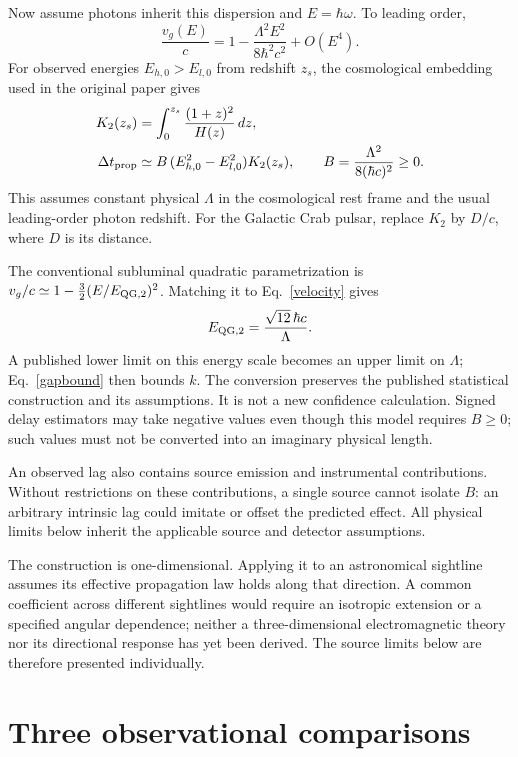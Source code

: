 \documentclass[11pt]{article}
\begin{document}
Now assume photons inherit this dispersion and $E=\hbar\omega$. To leading order,
\begin{equation}\label{velocity}
 \frac{v_g(E)}{c}=1-\frac{\Lambda^2E^2}{8\hbar^2c^2}+O(E^4).
\end{equation}
For observed energies $E_{h,0}>E_{l,0}$ from redshift $z_s$, the cosmological embedding used in the original paper gives
\begin{align}
 K_2(z_s)&=\int_0^{z_s}\frac{(1+z)^2}{H(z)}\,dz,\\
 \Delta t_{\rm prop}&\simeq B\,(E_{h,0}^2-E_{l,0}^2)K_2(z_s),
 \qquad B=\frac{\Lambda^2}{8(\hbar c)^2}\geq0.\label{delay}
\end{align}
This assumes constant physical $\Lambda$ in the cosmological rest frame and the usual leading-order photon redshift. For the Galactic Crab pulsar, replace $K_2$ by $D/c$, where $D$ is its distance.

The conventional subluminal quadratic parametrization is $v_g/c\simeq1-\tfrac32(E/E_{\rm QG,2})^2$. Matching it to Eq.~\eqref{velocity} gives
\begin{equation}\label{conversion}
 E_{\rm QG,2}=\frac{\sqrt{12}\,\hbar c}{\Lambda}.
\end{equation}
A published lower limit on this energy scale becomes an upper limit on $\Lambda$; Eq.~\eqref{gapbound} then bounds $k$. The conversion preserves the published statistical construction and its assumptions. It is not a new confidence calculation. Signed delay estimators may take negative values even though this model requires $B\geq0$; such values must not be converted into an imaginary physical length.

An observed lag also contains source emission and instrumental contributions. Without restrictions on these contributions, a single source cannot isolate $B$: an arbitrary intrinsic lag could imitate or offset the predicted effect. All physical limits below inherit the applicable source and detector assumptions.

The construction is one-dimensional. Applying it to an astronomical sightline assumes its effective propagation law holds along that direction. A common coefficient across different sightlines would require an isotropic extension or a specified angular dependence; neither a three-dimensional electromagnetic theory nor its directional response has yet been derived. The source limits below are therefore presented individually.

\section{Three observational comparisons}
\end{document}
